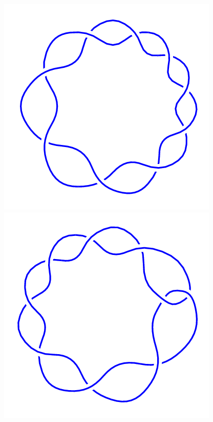 \begin{figure}[H]
    \begin{minipage}[b]{.18\linewidth}
        \centering
        \includegraphics[width=\linewidth]{../data/9_1.png}
    \end{minipage}
    \begin{minipage}[b]{.18\linewidth}
        \centering
        \includegraphics[width=\linewidth]{../data/9_2.png}

\end{minipage}
\end{figure}
